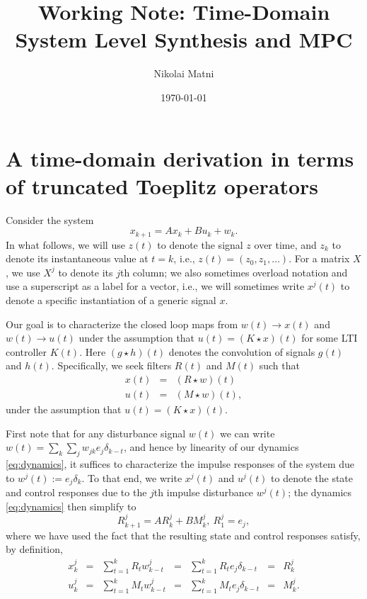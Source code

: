 \documentclass[11pt]{article}
\title{Working Note: Time-Domain System Level Synthesis and MPC}
\author{Nikolai Matni}
\date{\today}
\numberwithin{equation}{section}
\begin{document}
\maketitle

\section{A time-domain derivation in terms of truncated Toeplitz operators}
Consider the system
\begin{equation}
x_{k+1} = Ax_k + Bu_k + w_k.
\label{eq:dynamics}
\end{equation}
In what follows, we will use $z(t)$ to denote the signal $z$ over time, and $z_k$ to denote its instantaneous value at $t=k$, i.e., $z(t) = (z_0,z_1,\dots)$.  For a matrix $X$, we use $X^j$ to denote its $j$th column; we also sometimes overload notation and use a superscript as a label for a vector, i.e., we will sometimes write $x^j(t)$ to denote a specific instantiation of a generic signal $x$.

Our goal is to characterize the closed loop maps from $w(t) \to x(t)$ and $w(t) \to u(t)$ under the assumption that $u(t) = (K\star x)(t)$ for some LTI controller $K(t)$.  Here $(g\star h)(t)$ denotes the convolution of signals $g(t)$ and $h(t)$.  Specifically, we seek filters $R(t)$ and $M(t)$ such that
\begin{equation}
\begin{array}{rcl}
x(t) &=& (R\star w)(t) \\
u(t) &=& (M\star w)(t),
\end{array}
\label{eq:responses}
\end{equation}
under the assumption that $u(t) = (K\star x)(t)$.

First note that for any disturbance signal $w(t)$ we can write $w(t) = \sum_k \sum_j w_{jk}e_j\delta_{k-t}$, and hence by linearity of our dynamics \eqref{eq:dynamics}, it suffices to characterize the impulse responses of the system due to $w^j(t):= e_j \delta_k$.  To that end, we write $x^j(t)$ and $u^j(t)$ to denote the state and control responses due to the $j$th impulse disturbance $w^j(t)$; the dynamics \eqref{eq:dynamics} then simplify to
\begin{equation}
R^j_{k+1} = AR^j_k + BM^j_k, \ R^j_1 = e_j,
\end{equation}
where we have used the fact that the resulting state and control responses satisfy, by definition,
\[
\begin{array}{rclclcl}
x^j_k &=& \sum_{t=1}^k R_tw^j_{k-t} &=& \sum_{t=1}^k R_te_j \delta_{k-t} &=& R^j_k \\
u^j_k &=& \sum_{t=1}^k M_tw^j_{k-t} &=& \sum_{t=1}^k M_te_j \delta_{k-t} &=& M^j_k.
\end{array}
\]
\end{document}
